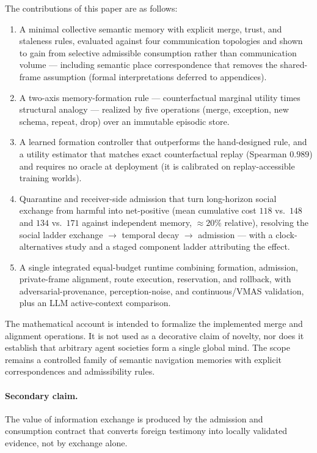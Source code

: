 \documentclass{article}
\begin{document}
The contributions of this paper are as follows:
\begin{enumerate}[leftmargin=20pt,itemsep=2pt,topsep=2pt]
\item A minimal collective semantic memory with explicit merge, trust,
and staleness rules, evaluated against four communication topologies
and shown to gain from selective admissible consumption rather than
communication volume --- including semantic place correspondence that
removes the shared-frame assumption (formal interpretations deferred
to appendices).
\item A two-axis memory-formation rule --- counterfactual marginal
utility times structural analogy --- realized by five operations
(merge, exception, new schema, repeat, drop) over an immutable episodic
store.
\item A learned formation controller that outperforms the
hand-designed rule, and a utility estimator that matches exact
counterfactual replay (Spearman $0.989$) and requires no oracle at
deployment (it is calibrated on replay-accessible training worlds).
\item Quarantine and receiver-side admission that turn long-horizon
social exchange from harmful into net-positive (mean cumulative cost
$118$ vs.\ $148$ and $134$ vs.\ $171$ against independent memory,
${\approx}20\%$ relative), resolving the social ladder exchange $\to$
temporal decay $\to$ admission --- with a clock-alternatives study and
a staged component ladder attributing the effect.
\item A single integrated equal-budget runtime combining formation,
admission, private-frame alignment, route execution, reservation, and
rollback, with adversarial-provenance, perception-noise, and
continuous/VMAS validation, plus an LLM active-context comparison.
\end{enumerate}

The mathematical account is intended to formalize the implemented
merge and alignment operations. It is not used as a decorative claim
of novelty, nor does it establish that arbitrary agent societies form
a single global mind. The scope remains a controlled family of
semantic navigation memories with explicit correspondences and
admissibility rules.

\paragraph{Secondary claim.} The value of information exchange is
produced by the admission and consumption contract that converts
foreign testimony into locally validated evidence, not by exchange
alone.
\end{document}
